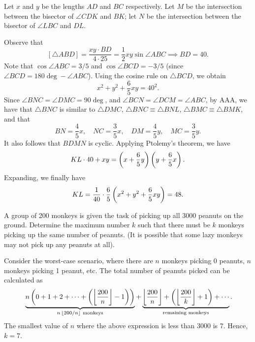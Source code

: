\begin{solution*}
    Let $x$ and $y$ be the lengths $AD$ and $BC$ respectively. Let $M$ be the intersection between the bisector of $\angle CDK$ and $BK$; let $N$ be the intersection between the bisector of $\angle LBC$ and $DL$.

    Observe that \[[\triangle ABD] = \frac{xy \cdot BD}{4 \cdot 25} = \frac12 xy \sin \angle ABC \implies BD = 40.\] Note that $\cos \angle ABC = 3/5$ and $\cos \angle BCD = -3/5$ (since $\angle BCD = 180\deg - \angle ABC$). Using the cosine rule on $\triangle BCD$, we obtain \[x^2 + y^2 + \frac65 xy = 40^2.\] Since $\angle BNC = \angle DMC = 90 \deg$, and $\angle BCN = \angle DCM = \angle ABC$, by AAA, we have that $\triangle BNC$ is similar to $\triangle DMC$, $\triangle BNC \equiv \triangle BNL$, $\triangle BMC \equiv \triangle BMK$, and that \[BN = \frac45 x, \quad NC = \frac35 x, \quad DM = \frac45 y, \quad MC = \frac35 y.\] It also follows that $BDMN$ is cyclic. Applying Ptolemy's theorem, we have \[KL \cdot 40 + xy = \left( x + \frac65 y \right)\left( y + \frac65 x \right).\] Expanding, we finally have \[KL = \frac1{40} \cdot \frac65 \left( x^2 + y^2 + \frac65 xy \right) = 48.\]
\end{solution*}

\clearpage
\begin{question}[7]\label{A::2023-O-1-23}
    A group of 200 monkeys is given the task of picking up all 3000 peanuts on the ground. Determine the maximum number $k$ such that there must be $k$ monkeys picking up the same number of peanuts. (It is possible that some lazy monkeys may not pick up any peanuts at all).
\end{question}
\begin{solution*}
    Consider the worst-case scenario, where there are $n$ monkeys picking 0 peanuts, $n$ monkeys picking 1 peanut, etc. The total number of peanuts picked can be calculated as \[\ \underbrace{n\left( 0 + 1 + 2 + \cdots + \left( \left\lfloor \frac{200}{n} \right\rfloor - 1 \right) \right)}_{\text{$n\left\lfloor 200/n \right\rfloor$ monkeys}} + \underbrace{\left\lfloor \frac{200}{n} \right\rfloor + \left( \left\lfloor \frac{200}{k} \right\rfloor + 1 \right) + \cdots}_{\text{remaining monkeys}}.\] The smallest value of $n$ where the above expression is less than 3000 is $7$. Hence, $k = 7$.
\end{solution*}

